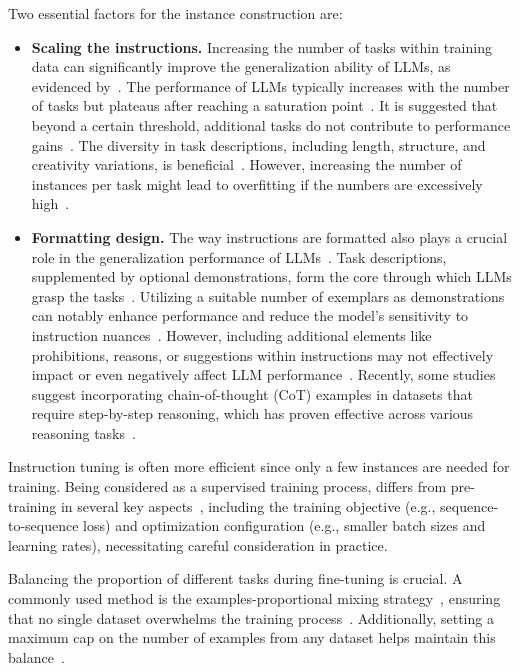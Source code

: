 Two essential factors for the instance construction are:
\begin{itemize}
	\item \textbf{Scaling the instructions.} {Increasing the number of tasks within training data can significantly improve the generalization ability of LLMs, as evidenced by~\textcite{wei2022fine, sanh2021distilbert, chowdhery2022palm}. The performance of LLMs typically increases with the number of tasks but plateaus after reaching a saturation point~\cite{raffel2023exploring, chowdhery2022palm}. It is suggested that beyond a certain threshold, additional tasks do not contribute to performance gains~\cite{raffel2023exploring}. The diversity in task descriptions, including length, structure, and creativity variations, is beneficial~\cite{wei2022fine}. However, increasing the number of instances per task might lead to overfitting if the numbers are excessively high~\cite{chowdhery2022palm, chen2023maybe}.}
	\item \textbf{Formatting design.} {
		      The way instructions are formatted also plays a crucial role in the generalization performance of LLMs~\cite{chowdhery2022palm}. Task descriptions, supplemented by optional demonstrations, form the core through which LLMs grasp the tasks~\cite{chowdhery2022palm}. Utilizing a suitable number of exemplars as demonstrations can notably enhance performance and reduce the model's sensitivity to instruction nuances~\cite{sanh2021distilbert, raffel2023exploring}. However, including additional elements like prohibitions, reasons, or suggestions within instructions may not effectively impact or even negatively affect LLM performance~\cite{chowdhery2022palm, mishra2022crosstask}. Recently, some studies suggest incorporating chain-of-thought (CoT) examples in datasets that require step-by-step reasoning, which has proven effective across various reasoning tasks~\cite{raffel2023exploring, iyer2022opt}.
	      }
\end{itemize}

Instruction tuning is often more efficient since only a few instances are needed for training.
Being considered as a supervised training process, differs from pre-training in several key aspects~\cite{chung2022scaling}, including the training objective (e.g., sequence-to-sequence loss) and optimization configuration (e.g., smaller batch sizes and learning rates), necessitating careful consideration in practice.

Balancing the proportion of different tasks during fine-tuning is crucial.
A commonly used method is the examples-proportional mixing strategy~\cite{raffel2023exploring}, ensuring that no single dataset overwhelms the training process~\cite{raffel2023exploring, wei2022fine}.
Additionally, setting a maximum cap on the number of examples from any dataset helps maintain this balance~\cite{raffel2023exploring, wei2022fine}.

